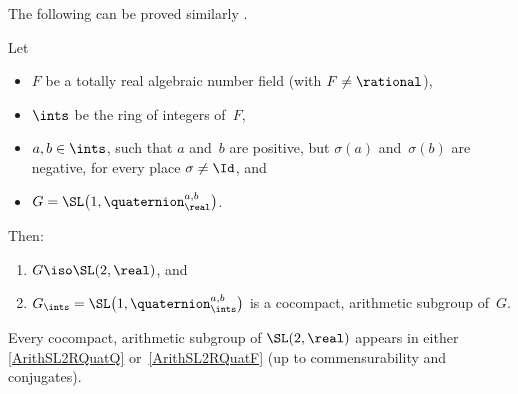 The following can be proved similarly .

\begin{prop} \label{ArithSL2RQuatF}
 Let
 \noprelistbreak
 \begin{itemize}
 \item
 $F$ be a totally real algebraic number
field\/ \textup(with $F \neq \rational$\textup),
 \item $\ints$ be the ring of integers of~$F$,
 \item $a,b \in \ints$, such that $a$
and~$b$ are positive, but $\sigma(a)$ and~$\sigma(b)$ are
negative, for every place $\sigma \neq \Id$, and
 \item $G = \SL \bigl( 1,\quaternion^{a,b}_\real \bigr) $.
 \end{itemize}
 Then:
 \begin{enumerate}
 \item \label{ArithSL2RQuatF-=SL2R}
 $G \iso \SL(2,\real)$, and
 \item \label{ArithSL2RQuatF-latt}
 $G_{\ints} = \SL \bigl( 1, \quaternion^{a,b}_{\ints}
\bigr)$ is a cocompact, arithmetic subgroup of~$G$.
 \end{enumerate}
 \end{prop}

\begin{prop} \label{CocpctArithSL2R}
Every cocompact, arithmetic subgroup of\/ $\SL(2,\real)$
appears in either
\cref{ArithSL2RQuatQ} or\/~\ref{ArithSL2RQuatF} %
\textup(up to commensurability and conjugates\/\textup).
 \end{prop}

